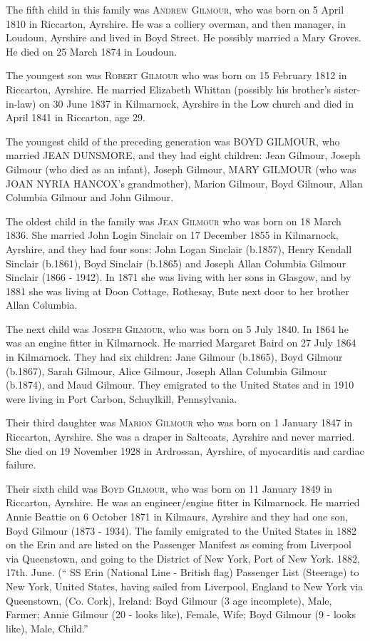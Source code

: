 The fifth child in this family was \textsc{Andrew Gilmour}, who was born on 5 April 1810 in Riccarton, Ayrshire. He was a colliery overman, and then manager, in Loudoun, Ayrshire and lived in Boyd Street. He possibly married a Mary Groves.  He died 
on 25 March 1874 in Loudoun.

The youngest son was \textsc{Robert Gilmour}  who was born on 15 February 1812 in Riccarton, Ayrshire. He married Elizabeth Whittan (possibly his brother's sister-in-law) on 30 June 1837 in Kilmarnock, Ayrshire in the Low church and died in April 1841 in Riccarton, age 29.


The youngest child of the preceding generation was \uppercase{Boyd Gilmour}, who married \uppercase{Jean Dunsmore}, and they had eight children:  Jean Gilmour, Joseph Gilmour (who died as an infant), Joseph Gilmour, \uppercase{Mary Gilmour} (who was \uppercase{Joan Nyria Hancox}'s grandmother), Marion Gilmour, Boyd Gilmour, Allan Columbia Gilmour and John Gilmour. 

The oldest child in the family was \textsc{Jean Gilmour} who was born on 18 March 1836. She married John Login Sinclair on 17 December 1855 in Kilmarnock, Ayrshire, and they had four sons: John Logan Sinclair (b.1857), Henry Kendall Sinclair (b.1861), 
Boyd Sinclair (b.1865) and Joseph Allan Columbia Gilmour Sinclair (1866 - 1942).  In 1871 she was living with her sons in Glasgow, and by 1881 she was living at Doon Cottage, Rothesay, Bute next door to her brother Allan Columbia.

The next child was \textsc{Joseph Gilmour}, who was born on 5 July 1840. In 1864 he was an engine fitter in Kilmarnock. He married Margaret Baird on 27 July 1864 in Kilmarnock. They had six children: Jane Gilmour (b.1865), Boyd Gilmour (b.1867), Sarah Gilmour, Alice Gilmour, Joseph Allan Columbia Gilmour (b.1874), and Maud Gilmour. They emigrated to the United States and in 1910 were living in Port Carbon, Schuylkill, Pennsylvania.

Their third daughter was \textsc{Marion Gilmour} who was born on 1 January 1847 in Riccarton, Ayrshire. She was a draper in Saltcoats, Ayrshire and never married. She died on 19 November 1928 in Ardrossan, Ayrshire, of myocarditis and cardiac failure.

Their sixth child was \textsc{Boyd Gilmour}, who was born on 11 January 1849 in Riccarton, Ayrshire. He was an engineer/engine fitter in Kilmarnock. He married Annie Beattie on 6 October 1871 in Kilmaurs, Ayrshire and they had one son, Boyd Gilmour (1873 - 1934). The family emigrated to the United States in 1882 on the Erin and are listed on the Passenger Manifest as coming from Liverpool via Queenstown, and going to the District of New York, Port of New York. 1882, 17th. June. (`` SS Erin (National Line - British flag) Passenger List (Steerage) to New York, United States, having sailed from Liverpool, England to New York via Queenstown, (Co. Cork), Ireland: Boyd Gilmour (3 age incomplete), Male, Farmer; Annie Gilmour (20 - looks like), Female, Wife; Boyd Gilmour (9 - looks like), Male, Child.''

